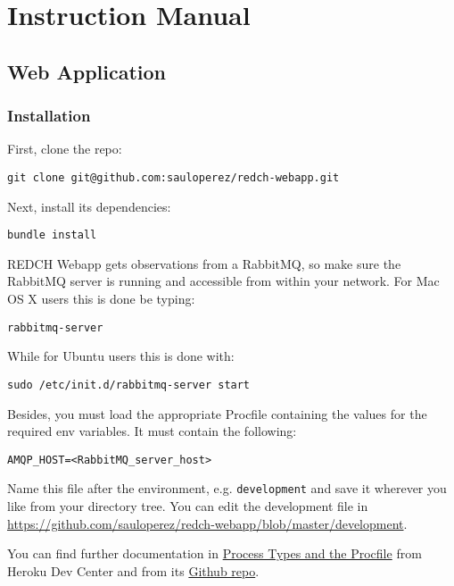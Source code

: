 \chapter{Instruction Manual}

\section{Web Application}\label{doc-webapp}

\subsection*{Installation}\label{installation}

First, clone the repo:

\begin{verbatim}
git clone git@github.com:sauloperez/redch-webapp.git
\end{verbatim}

Next, install its dependencies:

\begin{verbatim}
bundle install
\end{verbatim}

REDCH Webapp gets observations from a RabbitMQ, so make sure the
RabbitMQ server is running and accessible from within your network. For
Mac OS X users this is done be typing:

\begin{verbatim}
rabbitmq-server
\end{verbatim}

While for Ubuntu users this is done with:

\begin{verbatim}
sudo /etc/init.d/rabbitmq-server start
\end{verbatim}

Besides, you must load the appropriate Procfile containing the values
for the required env variables. It must contain the following:

\begin{verbatim}
AMQP_HOST=<RabbitMQ_server_host>
\end{verbatim}

Name this file after the environment, e.g. \texttt{development} and save
it wherever you like from your directory tree. You can edit the
development file in
\url{https://github.com/sauloperez/redch-webapp/blob/master/development}.

You can find further documentation in
\href{https://devcenter.heroku.com/articles/procfile\#developing-locally-with-foreman}{Process
Types and the Procfile} from Heroku Dev Center and from its
\href{https://github.com/ddollar/foreman}{Github repo}.

